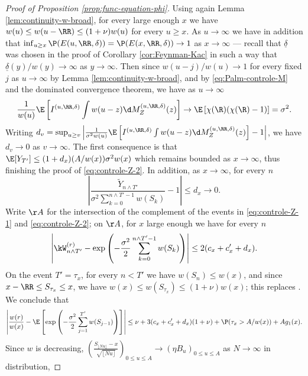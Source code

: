 \documentclass[10pt,a4paper]{article}
\begin{document}
\begin{proof}[Proof of Proposition \ref{prop:func-equation-phi}]
Using again Lemma \ref{lem:continuity-w-broad}, for every large enough $x$ we have $w(u) \leq w(u-\RR) \leq (1+\nu)w(u)$ for every $u\geq x$. As $u\to\infty$ we have in addition that $\inf_{u\geq x} \P(E(u,\RR,\delta)) = \P(E(x,\RR,\delta)) \to 1$ as $x\to\infty$ --- recall that $\underline{\delta}$ was chosen in the proof of Corollary \ref{cor:Feynman-Kac} in such a way that $\underline{\delta}(y)/w(y) \to \infty$ as $y\to\infty$. Then since $w(u-j)/w(u) \to 1$ for every fixed $j$ as $u\to\infty$ by Lemma \ref{lem:continuity-w-broad}, and by \eqref{eq:Palm-controle-M} and the dominated convergence theorem, we have as $u\to\infty$ 
\begin{align*}
\frac{1}{w(u)} \E\left[ I^{(u,\RR,\delta)} \int w(u-z) \d M_{Z}^{(u, \RR, \delta)}(z) \right] \to \E\left[ \chi(\R)(\chi(\R)-1)\right] = \sigma^2 .
\end{align*}
Writing $d_v = \sup_{u\geq v} \left|\frac{1}{\sigma^2 w(u)} \E\left[ I^{(u,\RR,\delta)} \int w(u-z) \d M_{Z}^{(u, \RR, \delta)}(z) \right] - 1\right|$, we have $d_v \to 0$ as $v\to \infty$. 
The first consequence is that $\E[Y_{T'}] \leq (1+d_x) (A/w(x)) \sigma^2 w(x)$ %
which remains bounded as $x\to\infty$, thus finishing the proof of \eqref{eq:controle-Z-2}. 
In addition, as $x\to\infty$, for every $n$
\begin{equation}\label{eq:controle-Z-3}
\left| \frac{\tilde Y_{n\wedge T'}}{\sigma^2 \sum_{k=0}^{n\wedge T'-1} w(S_k)} - 1 \right| \leq d_x \to 0 .
\end{equation}
%
Write $\AA$ for the intersection of the complement of the events in \eqref{eq:controle-Z-1} and \eqref{eq:controle-Z-2}; on $\AA$, for $x$ large enough we have for every $n$ 
\[ \left| \kW^{(r)}_{n\wedge T'} - \exp\left(-\frac{\sigma^2}{2} \sum_{k=0}^{n\wedge T'-1} w(S_k) \right) \right| \leq 2(c_x + c'_x + d_x) . \]
%
%
On the event $T' = \tau_x$, for every $n< T'$ we have $w(S_n) \leq w(x)$, and since $x-\RR \leq S_{\tau_x} \leq x $, we have $w(x) \leq w(S_{\tau_x}) \leq (1+\nu)w(x)$; this replaces \cite[Lemma 11]{lalley2015maximal}. We conclude that 
\begin{align*}
\left| \frac{w(r)}{w(x)} - \E\left[ \exp\left( - \frac{\sigma^2}{2} \sum_{j=1}^{T'} w(S_{j-1}) \right) \right] \right| \leq \nu + 3(c_x+c'_x+d_x) (1+\nu) + \P(\tau_x>A/w(x)) + A g_1(x) .
\end{align*}
%
%
Since $w$ is decreasing, $\left(\frac{S_{\lfloor Nu\rfloor}-x}{\sqrt{\lfloor Nu \rfloor}}\right)_{0\leq u\leq A} \to (\eta B_u)_{0\leq u\leq A}$ as $N\to\infty$ in distribution,

\end{proof}
\end{document}
